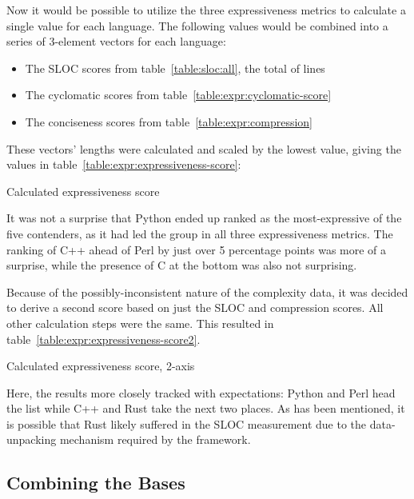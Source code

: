Now it would be possible to utilize the three expressiveness metrics to calculate a single value for each language. The following values would be combined into a series of 3-element vectors for each language:

\begin{itemize}
\item The SLOC scores from table~\ref{table:sloc:all}, the total of lines
\item The cyclomatic scores from table~\ref{table:expr:cyclomatic-score}
\item The conciseness scores from table~\ref{table:expr:compression}
\end{itemize}

These vectors' lengths were calculated and scaled by the lowest value, giving the values in table~\ref{table:expr:expressiveness-score}:

\begin{table}[!htb]

\caption{Calculated expressiveness score}
\label{table:expr:expressiveness-score}
\end{table}

It was not a surprise that Python ended up ranked as the most-expressive of the five contenders, as it had led the group in all three expressiveness metrics. The ranking of C++ ahead of Perl by just over 5 percentage points was more of a surprise, while the presence of C at the bottom was also not surprising.

Because of the possibly-inconsistent nature of the complexity data, it was decided to derive a second score based on just the SLOC and compression scores. All other calculation steps were the same. This resulted in table~\ref{table:expr:expressiveness-score2}.

\begin{table}[!htb]

\caption{Calculated expressiveness score, 2-axis}
\label{table:expr:expressiveness-score2}
\end{table}

Here, the results more closely tracked with expectations: Python and Perl head the list while C++ and Rust take the next two places. As has been mentioned, it is possible that Rust likely suffered in the SLOC measurement due to the data-unpacking mechanism required by the framework.

\subsection{Combining the Bases}
\label{subsec:combined}
